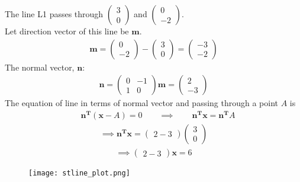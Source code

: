 \documentclass[12pt]{article}
\newcommand{\myvec}[1]{\ensuremath{\begin{pmatrix}#1\end{pmatrix}}} %
\begin{document}
\noindent
The line L1 passes through $\myvec{3 \\ 0}$ and $\myvec{0 \\ -2}$. \\

\noindent Let direction vector of this line be $\mathbf{m}$.
\begin{align*}
	\mathbf{m} = \myvec{0\\-2} - \myvec{3\\0} = \myvec{-3\\-2}
\end{align*}
The normal vector, $\mathbf{n}$: 
\begin{align*}
	\mathbf{n} = \myvec{0 & -1 \\ 1 & 0}\mathbf{m} = \myvec{2 \\ -3}
\end{align*}
The equation of line in terms of normal vector and passing through a point 
$A$ is
\begin{align*}
	\quad \mathbf{n^T}(\mathbf{x} - A ) = 0
	\qquad \implies \qquad \mathbf{n^Tx} = \mathbf{n^T}A
\end{align*}
\begin{align*}
	\implies \mathbf{n^Tx}= \myvec{2 -3}\myvec{3 \\ 0}
\end{align*}
\begin{align}
	\implies \myvec{2 -3}\mathbf{x} = 6	\label{eqL1}
\end{align}
\begin{figure}[htbp]
\centering
\texttt{[image: stline\_plot.png]}
\caption{}
\end{figure}
\end{document}
